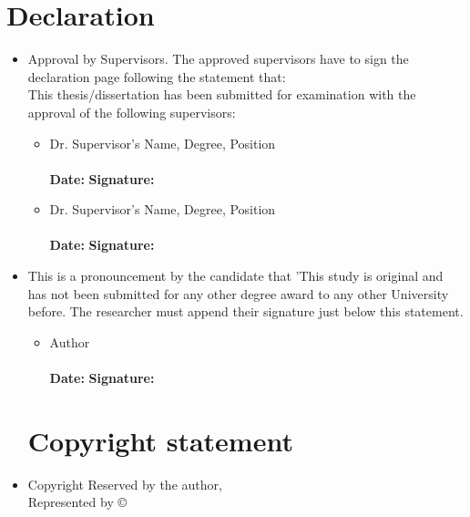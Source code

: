 

\section*{Declaration}

\begin{itemize}



\item Approval by Supervisors. The approved supervisors have to sign the declaration page following the statement that:\\
This thesis/dissertation has been submitted for examination with the approval of the following supervisors:
\begin{itemize}

    \item Dr. Supervisor's Name, Degree, Position
    \\
    \vspace{.3cm}
    \\
    \textbf{Date:} \underline{\hspace{4cm}} \hfill \textbf{Signature:} \underline{\hspace{6cm}}
    
    \vspace{.3cm}

    \item Dr. Supervisor's Name, Degree, Position
    \\
    \vspace{.3cm}
    \\
    \textbf{Date:} \underline{\hspace{4cm}} \hfill \textbf{Signature:} \underline{\hspace{6cm}}
    
\end{itemize}


\dotfill

\item This is a pronouncement by the candidate that 'This study is original and has not been submitted for any other degree award to any other University before. The researcher must append their signature just below this statement.

\begin{itemize}
    \item Author
    \\
    \vspace{.3cm}
    \\
    \textbf{Date:} \underline{\hspace{4cm}} \hfill \textbf{Signature:} \underline{\hspace{6cm}}
    
\end{itemize}

\dotfill

\section*{Copyright statement}

\item Copyright Reserved by the author,\\
Represented by ©

\end{itemize}
